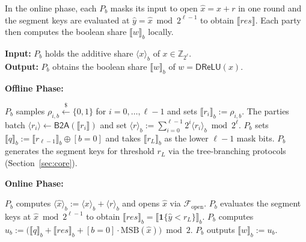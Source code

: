 \documentclass[journal]{IEEEtran}
\theoremstyle{definition}
\theoremstyle{plain}
\newcommand{\Z}{\mathbb{Z}}
\newcommand{\ashare}[1]{\langle #1 \rangle}             %
\newcommand{\bshare}[1]{\llbracket #1 \rrbracket}        %
\newcommand{\DReLU}{\mathsf{DReLU}}
\newcommand{\ind}[1]{\mathbf{1}\{#1\}}
\begin{document}
In the online phase, each $P_b$ masks its input to open $\hat{x}=x+r$ in one round and the
segment keys are evaluated at $\hat{y}=\hat{x}\bmod 2^{\ell-1}$ to obtain
$\bshare{\mathit{res}}$. Each party then computes 
the boolean share $\bshare{w}_b$ locally.

\begin{algorithm}[h]
  \caption{Dealerless DReLU ($\Pi_{\DReLU}$)}
  \label{alg:drelu}
  \textbf{Input:} $P_b$ holds the additive share $\ashare{x}_b$ of $x \in \Z_{2^\ell}$. \\
  \textbf{Output:} $P_b$ obtains the boolean share $\bshare{w}_b$ of $w = \DReLU(x)$.

  \vspace{0.3em}
  \textbf{Offline Phase:}
  \begin{algorithmic}[1]
    \State $P_b$ samples $\rho_{i,b}\stackrel{\$}{\leftarrow}\{0,1\}$ for $i=0,\ldots,\ell-1$ and sets $\bshare{r_i}_b:=\rho_{i,b}$.
    \State The parties batch $\ashare{r_i}\gets\mathsf{B2A}(\bshare{r_i})$ and set $\ashare{r}_b:=\sum_{i=0}^{\ell-1}2^i\ashare{r_i}_b\bmod2^\ell$.
    \State $P_b$ sets $\bshare{q}_b:=\bshare{r_{\ell-1}}_b\oplus[b{=}0]$ and takes $\bshare{r_L}_b$ as the lower $\ell-1$ mask bits.
    \State $P_b$ generates the segment keys for threshold $r_L$ via the tree-branching protocols (Section~\ref{sec:core}).
  \end{algorithmic}

  \vspace{0.3em}
  \textbf{Online Phase:}
  \begin{algorithmic}[1]
  \State $P_b$ computes $\ashare{\hat{x}}_b := \ashare{x}_b + \ashare{r}_b$ and opens $\hat{x}$ via $\mathcal{F}_{\mathrm{open}}$.
  \State $P_b$ evaluates the segment keys at $\hat{x}\bmod 2^{\ell-1}$ to obtain $\bshare{\mathit{res}}_b=\bshare{\ind{\hat{y}<r_L}}_b$. 
  \State $P_b$ computes $u_b := \big( \bshare{q}_b + \bshare{\mathit{res}}_b + [b{=}0]\cdot\mathrm{MSB}(\hat{x}) \big) \bmod 2$. 
  \State $P_b$ outputs $\bshare{w}_b := u_b$.
  \end{algorithmic}
\end{algorithm}
\end{document}
